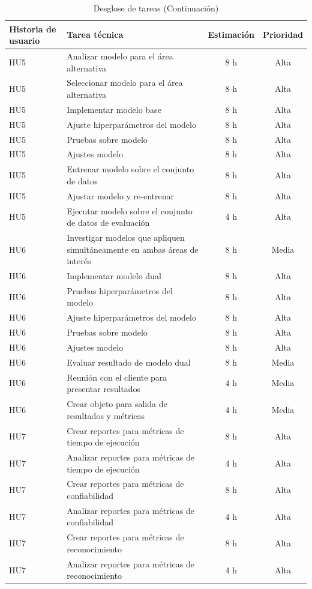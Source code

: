 \documentclass[
11pt, %
]{charter}
\begin{document}
\begin{table}[H]
\caption{Desglose de tareas (Continuación)}
\centering
\begin{tabularx}{\linewidth}{@{}|l|X|c|c|@{}}
\hline
\rowcolor[HTML]{C0C0C0}
Historia de usuario & Tarea técnica & Estimación & Prioridad \\ \hline

HU5 & Analizar modelo para el área alternativa & 8 h & Alta \\ \hline
HU5 & Seleccionar modelo para el área alternativa & 8 h & Alta \\ \hline

HU5 & Implementar modelo base & 8 h & Alta \\ \hline
HU5 & Ajuste hiperparámetros del modelo & 8 h & Alta \\ \hline
HU5 & Pruebas sobre modelo & 8 h & Alta \\ \hline
HU5 & Ajustes modelo & 8 h & Alta \\ \hline

HU5 & Entrenar modelo sobre el conjunto de datos & 8 h & Alta \\ \hline
HU5 & Ajustar modelo y re-entrenar & 8 h & Alta \\ \hline

HU5 & Ejecutar modelo sobre el conjunto de datos de evaluación & 4 h & Alta \\ \hline

HU6 & Investigar modelos que apliquen simultáneamente en ambas áreas de interés & 8 h & Media \\ \hline

HU6 & Implementar modelo dual & 8 h & Alta \\ \hline
HU6 & Pruebas hiperparámetros del modelo & 8 h & Alta \\ \hline
HU6 & Ajuste hiperparámetros del modelo & 8 h & Alta \\ \hline
HU6 & Pruebas sobre modelo & 8 h & Alta \\ \hline
HU6 & Ajustes modelo & 8 h & Alta \\ \hline

HU6 & Evaluar resultado de modelo dual & 8 h & Media \\ \hline
HU6 & Reunión con el cliente para presentar resultados & 4 h & Media \\ \hline
HU6 & Crear objeto para salida de resultados y métricas & 4 h & Media \\ \hline

HU7 & Crear reportes para métricas de tiempo de ejecución & 8 h & Alta \\ \hline
HU7 & Analizar reportes para métricas de tiempo de ejecución & 4 h & Alta \\ \hline
HU7 & Crear reportes para métricas de confiabilidad & 8 h & Alta \\ \hline
HU7 & Analizar reportes para métricas de confiabilidad & 4 h & Alta \\ \hline
HU7 & Crear reportes para métricas de reconocimiento & 8 h & Alta \\ \hline
HU7 & Analizar reportes para métricas de reconocimiento & 4 h & Alta \\ \hline


\end{tabularx}
\end{table}
\end{document}
